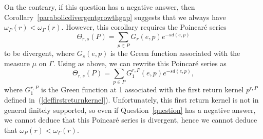 \documentclass{amsart}
\newcommand{\showcomments}{yes}
\newenvironment{comment}%
{\ifthenelse{\equal{\showcomments}{yes}}%
{\footnotemark
    \begin{lrbox}{\commentbox}
    \begin{minipage}[t]{1.25in}\raggedright\sffamily\upshape\tiny
    \footnotemark[\arabic{footnote}]}%
{\begin{lrbox}{\commentbox}}}%
{\ifthenelse{\equal{\showcomments}{yes}}%
{\end{minipage}\end{lrbox}\marginpar{\usebox{\commentbox}}}%
{\end{lrbox}}}
\theoremstyle{definition}
\theoremstyle{remark}
\newcommand{\ywy}[1]{{\color{red}{#1}}}
\begin{document}
On the contrary, if this question has a negative answer, then Corollary~\ref{parabolicdivergentgrowthgap} suggests that we always have $\omega_P(r)<\omega_\Gamma(r)$.
However, this corollary requires the Poincar\'e series
$$\Theta_{r,s}(P)=\sum_{p\in P} G_r(e,p) e^{-s d(e,p)} $$
to be divergent, where $G_s(e,p)$ is the Green function associated with the measure $\mu$ on $\Gamma$.
Using \cite[Lemma~4.4]{DG21} as above, we can rewrite this Poincar\'e series as
$$\Theta_{r,s}(P)=\sum_{p\in P} G_1^{r,P}(e,p) e^{-s d(e,p)},$$
where $G_1^{r,P}$ is the Green function at 1 associated with the first return kernel $p^{r,P}$ defined in~(\ref{deffirstreturnkernel}).
Unfortunately, this first return kernel is not in general finitely supported, so even if Question~\ref{question} has a negative answer, we cannot deduce that this Poincar\'e series is divergent, hence we cannot deduce that $\omega_P(r)<\omega_\Gamma(r)$.
\end{document}
